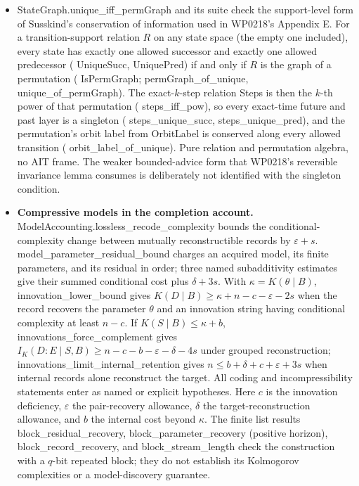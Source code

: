 \documentclass[11pt,a4paper]{article}
\newcommand{\lean}[1]{{\ttfamily\small
  \let\leanunderscore\_\def\_{\leanunderscore\allowbreak}#1}}
\begin{document}
\begin{itemize}[leftmargin=1.4em,itemsep=1pt]
\item \lean{StateGraph.unique\_iff\_permGraph} and its suite check the support-level form of
Susskind's conservation of information used in WP0218's Appendix E. For a transition-support
relation $R$ on any state space (the empty one included), every state has exactly one allowed
successor and exactly one allowed predecessor (\lean{UniqueSucc}, \lean{UniquePred}) if and
only if $R$ is the graph of a permutation (\lean{IsPermGraph};
\lean{permGraph\_of\_unique}, \lean{unique\_of\_permGraph}). The exact-$k$-step relation
\lean{Steps} is then the $k$-th power of that permutation (\lean{steps\_iff\_pow}), so every
exact-time future and past layer is a singleton (\lean{steps\_unique\_succ},
\lean{steps\_unique\_pred}), and the permutation's orbit label from \lean{OrbitLabel} is
conserved along every allowed transition (\lean{orbit\_label\_of\_unique}). Pure relation and
permutation algebra, no AIT frame. The weaker bounded-advice form that WP0218's reversible
invariance lemma consumes is deliberately not identified with the singleton condition.
\item \textbf{Compressive models in the completion account.}
\lean{ModelAccounting.lossless\_recode\_complexity} bounds the conditional-complexity
change between mutually reconstructible records by $\varepsilon+s$.
\lean{model\_parameter\_residual\_bound} charges an acquired model, its finite parameters,
and its residual in order; three named subadditivity estimates give their summed
conditional cost plus $\delta+3s$. With $\kappa=K(\theta\mid B)$,
\lean{innovation\_lower\_bound} gives
$K(D\mid B)\ge\kappa+n-c-\varepsilon-2s$ when the record recovers the parameter
$\theta$ and an innovation string having conditional complexity at least $n-c$.
If $K(S\mid B)\le\kappa+b$, \lean{innovations\_force\_complement} gives
$I_K(D:E\mid S,B)\ge n-c-b-\varepsilon-\delta-4s$ under grouped reconstruction;
\lean{innovations\_limit\_internal\_retention} gives
$n\le b+\delta+c+\varepsilon+3s$ when internal records alone reconstruct the target.
All coding and incompressibility statements enter as named or explicit hypotheses.
Here $c$ is the innovation deficiency, $\varepsilon$ the pair-recovery allowance,
$\delta$ the target-reconstruction allowance, and $b$ the internal cost beyond $\kappa$.
The finite list results \lean{block\_residual\_recovery},
\lean{block\_parameter\_recovery} (positive horizon), \lean{block\_record\_recovery},
and \lean{block\_stream\_length} check the construction with a $q$-bit repeated block; they do not
establish its Kolmogorov complexities or a model-discovery guarantee.

\end{itemize}
\end{document}
